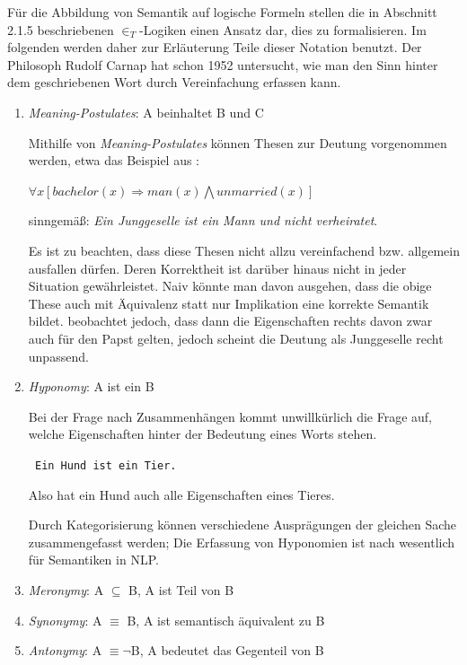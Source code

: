 \documentclass[12pt]{report}
\begin{document}
Für die Abbildung von Semantik auf logische Formeln stellen die in Abschnitt 2.1.5 beschriebenen $\in_T$-Logiken einen Ansatz dar, dies zu formalisieren. Im folgenden werden daher zur Erläuterung Teile dieser Notation benutzt. Der Philosoph Rudolf Carnap hat schon 1952  untersucht, wie man den Sinn hinter dem geschriebenen Wort durch Vereinfachung erfassen kann. 
\begin{enumerate}
\item \textit{Meaning-Postulates}: A beinhaltet B und C

Mithilfe von \textit{Meaning-Postulates} können Thesen zur Deutung vorgenommen werden, etwa das Beispiel aus \cite{car52}:

$\forall x[bachelor(x)\Rightarrow man(x)\bigwedge unmarried(x)]$

sinngemäß: \textit{Ein Junggeselle ist ein Mann und nicht verheiratet}.

Es ist zu beachten, dass diese Thesen nicht allzu vereinfachend bzw. allgemein ausfallen dürfen. Deren Korrektheit ist darüber hinaus nicht in jeder Situation gewährleistet. Naiv könnte man davon ausgehen, dass die obige These auch mit Äquivalenz statt nur Implikation eine korrekte Semantik bildet. \cite{car52} beobachtet jedoch, dass dann die Eigenschaften rechts davon zwar auch für den Papst gelten, jedoch scheint die Deutung als Junggeselle recht unpassend.

\item \textit{Hyponomy}: A ist ein B

Bei der Frage nach Zusammenhängen kommt unwillkürlich die Frage auf, welche Eigenschaften hinter der Bedeutung eines Worts stehen. 

\tt
Ein Hund ist ein Tier. 
\rm

Also hat ein Hund auch alle Eigenschaften eines Tieres.

Durch Kategorisierung können verschiedene Ausprägungen  der gleichen Sache zusammengefasst werden; Die Erfassung von Hyponomien ist nach \cite{cop04} wesentlich für Semantiken in NLP.

\item \textit{Meronymy}: A $\subseteq$ B, A ist Teil von B

\item \textit{Synonymy}: A $\equiv$ B, A ist semantisch äquivalent zu B

\item \textit{Antonymy}: A $\equiv \neg$B, A bedeutet das Gegenteil von B

\end{enumerate}
\end{document}
